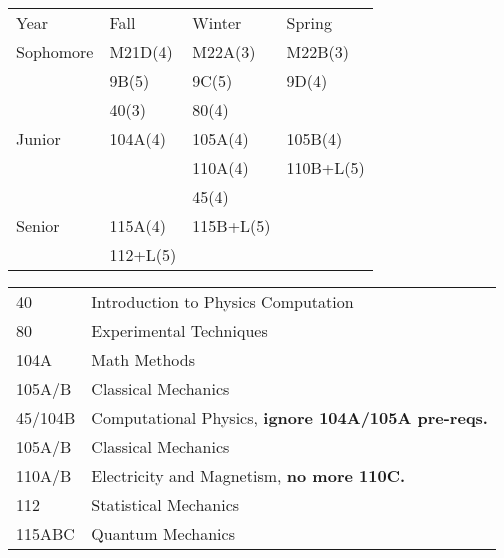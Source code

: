 \documentclass[12pt]{article}
\begin{document}
\begin{center}
\begin{tabular}{|l|l|l|l|}
\hline
Year      & Fall    & Winter & Spring \\
Sophomore & M21D(4)  & M22A(3)  & M22B(3)\\ 
          & 9B(5)    & 9C(5)    & 9D(4) \\
          & 40(3)    & 80(4)    &  \\
\hline 
Junior   & 104A(4)   & 105A(4) & 105B(4) \\
         &           & 110A(4) & 110B+L(5) \\         
         &           & 45(4)   & \\
\hline
Senior   & 115A(4)    & 115B+L(5)     & \\
         & 112+L(5)   &               &  \\
\hline
\end{tabular}
\end{center}


\begin{center}
\begin{tabular}{|l|l|}
\hline
40 & Introduction to Physics Computation \\ 
80 & Experimental Techniques \\
104A & Math Methods \\
105A/B & Classical Mechanics \\
45/104B & Computational Physics, {\bf ignore 104A/105A pre-reqs.} \\
105A/B & Classical Mechanics \\
110A/B & Electricity and Magnetism, \bf no more 110C. \\
112 & Statistical Mechanics \\
115ABC & Quantum Mechanics \\
\hline
\end{tabular}
\end{center}

\newpage
\end{document}
